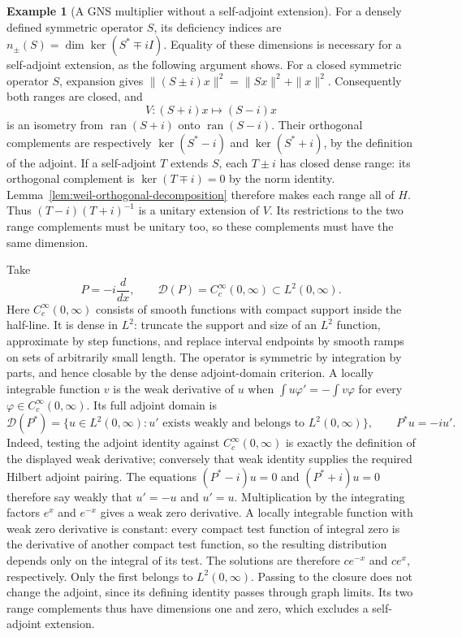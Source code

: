 \documentclass[11pt]{article}
\theoremstyle{definition}
\newtheorem{example}[theorem]{Example}
\theoremstyle{remark}
\numberwithin{equation}{section}
\begin{document}
\begin{example}[A GNS multiplier without a self-adjoint extension]
\label{ex:gns-half-line}
For a densely defined symmetric operator $S$, its deficiency indices are
$n_\pm(S)=\dim\ker(S^*\mp iI)$.  Equality of these dimensions is
necessary for a self-adjoint extension, as the following argument shows.  For a closed symmetric operator
$S$, expansion gives
$\|(S\pm i)x\|^2=\|Sx\|^2+\|x\|^2$.
Consequently both ranges are closed, and
\[
 V:(S+i)x\longmapsto(S-i)x
\]
is an isometry from $\operatorname{ran}(S+i)$ onto
$\operatorname{ran}(S-i)$.  Their orthogonal complements are respectively
$\ker(S^*-i)$ and $\ker(S^*+i)$, by the definition of the adjoint.
If a self-adjoint $T$ extends $S$, each $T\pm i$ has closed dense range:
its orthogonal complement is $\ker(T\mp i)=0$ by the norm identity.
Lemma~\ref{lem:weil-orthogonal-decomposition} therefore makes each range
all of $H$.
Thus $(T-i)(T+i)^{-1}$ is a unitary extension of $V$.
Its restrictions to the two range complements must be unitary too, so
these complements must have the same dimension.

Take
\[
 P=-i\frac{d}{dx},\qquad \mathcal D(P)=C_c^\infty(0,\infty)
 \subset L^2(0,\infty).
\]
Here $C_c^\infty(0,\infty)$ consists of smooth functions with compact
support inside the half-line.  It is dense in $L^2$: truncate the support
and size of an $L^2$ function, approximate by step functions, and replace interval endpoints
by smooth ramps on sets of arbitrarily small length.  The operator is
symmetric by integration by parts, and hence closable by the dense
adjoint-domain criterion.  A locally integrable function $v$ is the weak
derivative of $u$ when
$\int u\varphi'=-\int v\varphi$ for every
$\varphi\in C_c^\infty(0,\infty)$.  Its full adjoint domain is
\[
 \mathcal D(P^*)=\{u\in L^2(0,\infty):u'
                  \text{ exists weakly and belongs to }L^2(0,\infty)\},
 \qquad P^*u=-iu'.
\]
Indeed, testing the adjoint identity against $C_c^\infty(0,\infty)$
is exactly the definition of the displayed weak derivative; conversely
that weak identity supplies the required Hilbert adjoint pairing.
The equations $(P^*-i)u=0$ and $(P^*+i)u=0$ therefore say weakly
that $u'=-u$ and $u'=u$.
Multiplication by the integrating factors $e^x$ and $e^{-x}$ gives a weak
zero derivative.  A locally integrable function with weak zero derivative
is constant: every compact test function of integral zero is the derivative
of another compact test function, so the resulting distribution depends
only on the integral of its test.  The solutions are therefore $ce^{-x}$
and $ce^x$, respectively.  Only the first belongs to $L^2(0,\infty)$.
Passing to the closure does not change the adjoint, since its defining
identity passes through graph limits.  Its two range complements thus
have dimensions one and zero, which excludes a self-adjoint extension.


\end{example}
\end{document}
